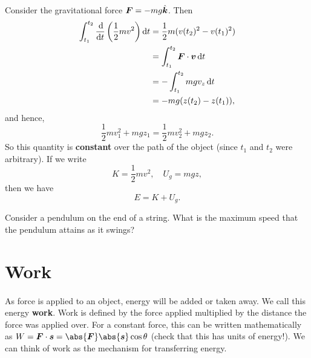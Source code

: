 \documentclass[../classical_mechanics.tex]{subfiles}
\begin{document}
        \paragraph{}
        Consider the gravitational force $\boldsymbol{F}=-mg\hat{\boldsymbol{k}}$. Then
        \begin{align}
            \int_{t_1}^{t_2}\dv{}{t}\left(\frac{1}{2}mv^2\right)\dd{t}&=\frac{1}{2}m(v(t_2)^2-v(t_1)^2)\\
            &=\int_{t_1}^{t_2}\vec{F}\cdot\vec{v}\dd{t}\\
            &=-\int_{t_1}^{t_2}mgv_z\dd{t}\\
            &=-mg(z(t_2)-z(t_1)),
        \end{align}
        and hence,
        \begin{equation}
            \frac{1}{2}mv_1^2+mgz_1=\frac{1}{2}mv_2^2+mgz_2.
        \end{equation}
        So this quantity is \textbf{constant} over the path of the object (since $t_1$ and $t_2$ were arbitrary).
        If we write
        \begin{equation}
            K=\frac{1}{2}mv^2,\quad U_g=mgz,
        \end{equation}
        then we have
        \begin{equation}
            E=K+U_g.
        \end{equation}
        \begin{example}
            Consider a pendulum on the end of a string. What is the maximum speed that the pendulum attains as it swings?
        \end{example}

    \section{Work}
        \paragraph{}
        As force is applied to an object, energy will be added or taken away.
        We call this energy \textbf{work}.
        Work is defined by the force applied multiplied by the distance the force was applied over.
        For a constant force, this can be written mathematically as $W=\vec{F}\cdot\vec{s}=\abs{\vec{F}}\abs{\vec{s}}\cos\theta$ (check that this has units of energy!).
        We can think of work as the mechanism for transferring energy.
        
\end{document}

